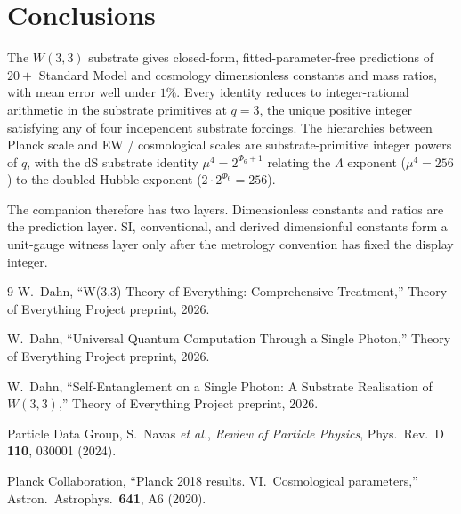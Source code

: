\documentclass[11pt]{article}
\begin{document}
\section{Conclusions}

The $W(3,3)$ substrate gives closed-form, fitted-parameter-free
predictions of $20+$ Standard Model and cosmology dimensionless
constants and mass ratios, with mean error well under $1\%$.  Every
identity reduces to integer-rational arithmetic in the substrate
primitives at $q = 3$, the unique positive integer satisfying any of
four independent substrate forcings.  The hierarchies between Planck
scale and EW / cosmological scales are substrate-primitive integer
powers of $q$, with the dS substrate identity $\mu^4 = 2^{\Phi_6+1}$
relating the $\Lambda$ exponent ($\mu^4 = 256$) to the doubled Hubble
exponent ($2 \cdot 2^{\Phi_6} = 256$).

The companion therefore has two layers.  Dimensionless constants and
ratios are the prediction layer.  SI, conventional, and derived
dimensionful constants form a unit-gauge witness layer only after the
metrology convention has fixed the display integer.

\begin{thebibliography}{9}
  W.~Dahn, ``W(3,3) Theory of Everything: Comprehensive Treatment,''
  Theory of Everything Project preprint, 2026.

  W.~Dahn, ``Universal Quantum Computation Through a Single Photon,''
  Theory of Everything Project preprint, 2026.

  W.~Dahn, ``Self-Entanglement on a Single Photon: A Substrate
  Realisation of $W(3,3)$,'' Theory of Everything Project preprint, 2026.

  Particle Data Group, S.~Navas \emph{et al.},
  \emph{Review of Particle Physics},
  Phys.\ Rev.\ D \textbf{110}, 030001 (2024).

  Planck Collaboration, ``Planck 2018 results.  VI.~Cosmological parameters,''
  Astron.\ Astrophys.\ \textbf{641}, A6 (2020).
\end{thebibliography}
\end{document}
